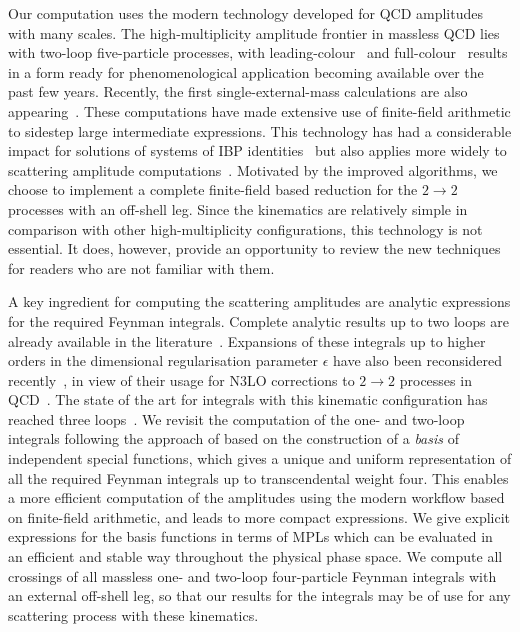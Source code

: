 \documentclass[main.tex]{subfiles}
\begin{document}
\smallskip

Our computation uses the modern technology developed for \ac{QCD} amplitudes
with many scales. The high-multiplicity amplitude frontier in massless \ac{QCD}
lies with two-loop five-particle processes, with
leading-colour~\cite{Abreu:2019odu,Abreu:2020cwb,Chawdhry:2020for,Agarwal:2021grm,Abreu:2021oya,Chawdhry:2021mkw}
and
full-colour~\cite{Agarwal:2021vdh,Badger:2021imn,Badger:2023mgf,Abreu:2023bdp}
results in a form ready for phenomenological application becoming available
over the past few years. Recently, the first single-external-mass calculations
are also
appearing~\cite{Hartanto:2019uvl,Badger:2021nhg,Badger:2021ega,Badger:2022ncb}.
These computations have made extensive use of finite-field arithmetic to
sidestep large intermediate expressions. This technology has had a considerable
impact for solutions of systems of \ac{IBP}
identities~\cite{vonManteuffel:2014ixa,Klappert:2020nbg,Smirnov:2019qkx} but
also applies more widely to scattering amplitude
computations~\cite{Peraro:2016wsq,Peraro:2019svx}. Motivated by the improved
algorithms, we choose to implement a complete finite-field based reduction for
the $2\to 2$ processes with an off-shell leg. Since the kinematics are
relatively simple in comparison with other high-multiplicity configurations,
this technology is not essential. It does, however, provide an opportunity to
review the new techniques for readers who are not familiar with them.

A key ingredient for computing the scattering amplitudes are analytic
expressions for the required Feynman integrals.  Complete analytic results up
to two loops are already available in the
literature~\cite{gehrmann:2000zt,gehrmann:2001ck,Gehrmann:2002zr}.  Expansions
of these integrals up to higher orders in the dimensional regularisation
parameter $\epsilon$ have also been reconsidered
recently~\cite{Gehrmann:2023etk}, in view of their usage for \ac{N3LO}
corrections to $2\to 2$ processes in
\ac{QCD}~\cite{Gehrmann:2022vuk,Gehrmann:2023zpz}.  The state of the art for
integrals with this kinematic configuration has reached three
loops~\cite{DiVita:2014pza,Canko:2020gqp,Canko:2021xmn,Henn:2023vbd}.  We
revisit the computation of the one- and two-loop integrals following the
approach of
based on the construction of a \emph{basis} of independent special functions,
which gives a unique and uniform representation of all the required Feynman
integrals up to transcendental weight four.  This enables a more efficient
computation of the amplitudes using the modern workflow based on finite-field
arithmetic, and leads to more compact expressions. We give explicit expressions
for the basis functions in terms of \acp{MPL} which can be evaluated in an
efficient and stable way throughout the physical phase space.  We compute all
crossings of all massless one- and two-loop four-particle Feynman integrals
with an external off-shell leg, so that our results for the integrals may be of
use for any scattering process with these kinematics.
\end{document}
